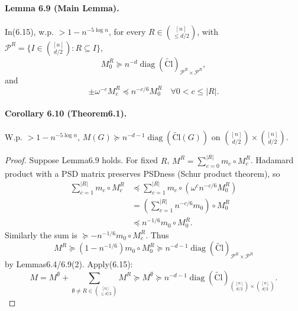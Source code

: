 \paragraph{Lemma 6.9 (Main Lemma).} In(6.15), w.p. $>1-n^{-5\log n}$, for every $R\in\binom{[n]}{\le d/2}$, with $\mathcal P^R=\{I\in\binom{[n]}{d/2}:R\subseteq I\}$,
\[M_0^R\succeq n^{-d}\operatorname{diag}(\widetilde{\mathrm{Cl}})_{\mathcal P^R\times\mathcal P^R},\tag{6.17}\]
and
\[\pm\omega^{-c}M_c^R\preceq n^{-c/6}M_0^R\quad\forall0<c\le|R|.\tag{6.18}\]
\paragraph{Corollary 6.10 (Theorem6.1).} W.p. $>1-n^{-5\log n}$, $M(G)\succeq n^{-d-1}\operatorname{diag}(\widetilde{\mathrm{Cl}}(G))$ on $\binom{[n]}{d/2}\times\binom{[n]}{d/2}$.
\begin{proof}Suppose Lemma6.9 holds. For fixed $R$, $M^R=\sum_{c=0}^{|R|}m_c\circ M_c^R$. Hadamard product with a PSD matrix preserves PSDness (Schur product theorem), so
\begin{align*}\sum_{c=1}^{|R|}m_c\circ M_c^R&\preceq\sum_{c=1}^{|R|}m_c\circ(\omega^cn^{-c/6}M_0^R)\\&=\left(\sum_{c=1}^{|R|}n^{-c/6}m_0\right)\circ M_0^R\\&\preceq n^{-1/6}m_0\circ M_0^R.\end{align*}
Similarly the sum is $\succeq-n^{-1/6}m_0\circ M_c^R$. Thus
\[M^R\succeq(1-n^{-1/6})m_0\circ M_0^R\succeq n^{-d-1}\operatorname{diag}(\widetilde{\mathrm{Cl}})_{\mathcal P^R\times\mathcal P^R}\]
by Lemmas6.4/6.9(2). Apply(6.15):
\[M=M^\emptyset+\sum_{\emptyset\ne R\in\binom{[n]}{\le d/2}}M^R\succeq M^\emptyset\succeq n^{-d-1}\operatorname{diag}(\widetilde{\mathrm{Cl}})_{\binom{[n]}{d/2}\times\binom{[n]}{d/2}}.\tag{6.19}\]\end{proof}
